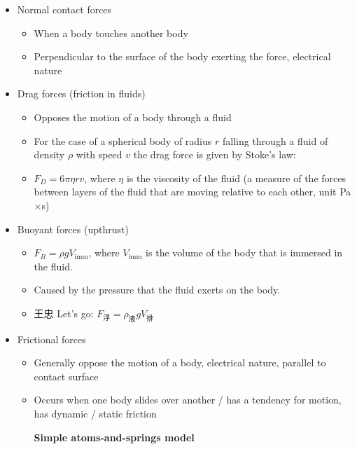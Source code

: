 \documentclass[a4paper,12pt]{article}
\begin{document}
\begin{itemize}
\begin{itemize}
\begin{itemize}
        \end{itemize}
  \end{itemize}
  \item Normal contact forces
  \begin{itemize}
    \item When a body touches another body
    \item Perpendicular to the surface of the body exerting the force, electrical nature
  \end{itemize}
  \item Drag forces (friction in fluids)
	\begin{itemize}
    \item Opposes the motion of a body through a fluid
    \item For the case of a spherical body of radius $r$ falling through a fluid of density $\rho$ with speed $v$ the drag force is given by Stoke's law:
    \item $F_D=6\pi\eta rv$, where $\eta$ is the viscosity of the fluid (a measure of the forces between layers of the fluid that are moving relative to each other, unit Pa$\times$s)
  \end{itemize}
  \item Buoyant forces (upthrust)
  \begin{itemize}
    \item $F_B=\rho g V_{\text{imm}}$, where $V_\text{imm}$ is the volume of the body that is immersed in the fluid.
    \item Caused by the pressure that the fluid exerts on the body.
    \item 王忠 Let's go: $F_\text{浮}=\rho_\text{液}gV_\text{排}$
  \end{itemize}
  \item Frictional forces
  \begin{itemize}
    \item Generally oppose the motion of a body, electrical nature, parallel to contact surface
    \item Occurs when one body slides over another / has a tendency for motion, has dynamic / static friction
    \begin{center}
	    {\bfseries\small Simple atoms-and-springs model}

\end{center}
\end{itemize}
\end{itemize}
\end{document}
